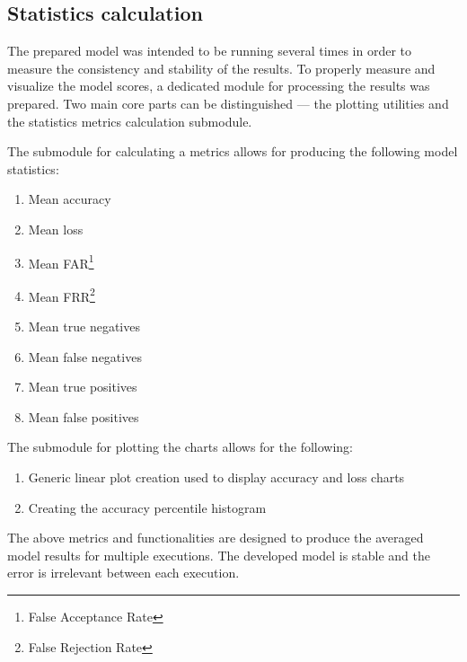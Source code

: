 \subsection{Statistics calculation}\label{subsec:statistics-calculation}
The prepared model was intended to be running several times in order to measure the consistency and stability of the results.
To properly measure and visualize the model scores, a dedicated module for processing the results was prepared.
Two main core parts can be distinguished --- the plotting utilities and the statistics metrics calculation submodule.

The submodule for calculating a metrics allows for producing the following model statistics:
\begin{enumerate}
    \item Mean accuracy
    \item Mean loss
    \item Mean FAR\footnote{False Acceptance Rate}
    \item Mean FRR\footnote{False Rejection Rate}
    \item Mean true negatives
    \item Mean false negatives
    \item Mean true positives
    \item Mean false positives
\end{enumerate}

The submodule for plotting the charts allows for the following:
\begin{enumerate}
    \item Generic linear plot creation used to display accuracy and loss charts
    \item Creating the accuracy percentile histogram
\end{enumerate}

The above metrics and functionalities are designed to produce the averaged model results for multiple executions.
The developed model is stable and the error is irrelevant between each execution.
